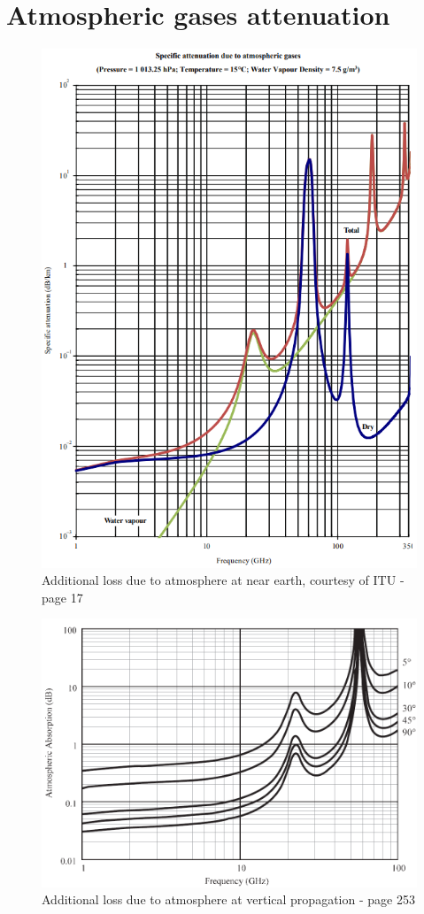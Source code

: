 \chapter{Atmospheric gases attenuation}
\begin{figure}[h]
\hspace{-0.5cm}
\includegraphics[scale=0.9]{figures/AbsorbsAtmosphere.PNG}
\caption{Additional loss due to atmosphere at near earth, courtesy of ITU\cite{ITUAtmosphere} - page 17}
\end{figure}

\begin{figure}[H]
\hspace{-1cm}
\includegraphics[scale=0.6]{figures/AbsorbsAtmosphereVertical.PNG}
\caption{Additional loss due to atmosphere at vertical propagation\cite{RFpropagation} - page 253}
\end{figure}
